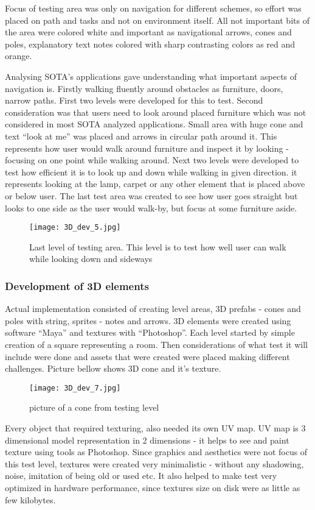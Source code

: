 Focus of testing area was only on navigation for different schemes, so effort was placed on path and tasks and not on environment itself. All not important bits of the area were colored white and important as navigational arrows, cones and poles, explanatory text notes colored with sharp contrasting colors as red and orange. 

Analysing SOTA’s applications gave understanding what important aspects of navigation is. Firstly walking fluently around obstacles as furniture, doors, narrow paths. First two levels were developed for this to test. Second consideration was that users need to look around placed furniture which was not considered in most SOTA analyzed applications. Small area with huge cone and text “look at me” was placed and arrows in circular path around it. This represents how user would walk around furniture and inspect it by looking - focusing on one point while walking around. Next two levels were developed to test how efficient it is to look up and down while walking in given direction. it represents looking at the lamp, carpet or any other element that is placed above or below user. The last test area was created to see how user goes straight but looks to one side as the user would walk-by, but focus at some furniture aside.
\begin{figure}[H]
\centering
\texttt{[image: 3D\_dev\_5.jpg]}
\caption{Last level of testing area. This level is to test how well user can walk while looking down and sideways}
\end{figure}

\subsubsection{Development of 3D elements}
Actual implementation consisted of creating level areas, 3D prefabs - cones and poles with string, sprites - notes and arrows. 3D elements were created using software “Maya” and textures with “Photoshop”. Each level started by simple creation of a square representing a room. Then considerations of what test it will include were done and assets that were created were placed making different challenges. Picture bellow shows 3D cone and it’s texture. 
\begin{figure}[H]
\centering
\texttt{[image: 3D\_dev\_7.jpg]}
\caption{picture of a cone from testing level}
\end{figure}

Every object that required texturing, also needed its own UV map. UV map is 3 dimensional model representation in 2 dimensions - it helps to see and paint texture using tools as Photoshop. Since graphics and aesthetics were not focus of this test level, textures were created very minimalistic - without any shadowing, noise, imitation of being old or used etc. It also helped to make test very optimized in hardware performance, since textures size on disk were as little as few kilobytes. 


